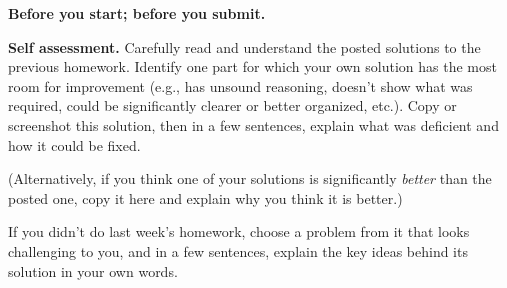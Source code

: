 \documentclass[11pt,addpoints]{exam}
\begin{document}

\hwpreface


\begin{questions}

  \addtocounter{question}{-1}
  \question[0] \textbf{Before you start; before you submit.} \nopagebreak


  \question[10] \textbf{Self assessment.} \nopagebreak
  Carefully read and understand the posted solutions to the previous homework.
  Identify one part for which your own solution has the most room for improvement (e.g., has unsound reasoning, doesn’t show what was required, could be significantly clearer or better organized, etc.).
  Copy or screenshot this solution, then in a few sentences, explain what was deficient and how it could be fixed.

  (Alternatively, if you think one of your solutions is significantly \emph{better} than the posted one, copy it here and explain why you think it is better.)

  If you didn't do last week's homework, choose a problem from it that looks challenging to you, and in a few sentences, explain the key ideas behind its solution in your own words.


\end{questions}
\end{document}
